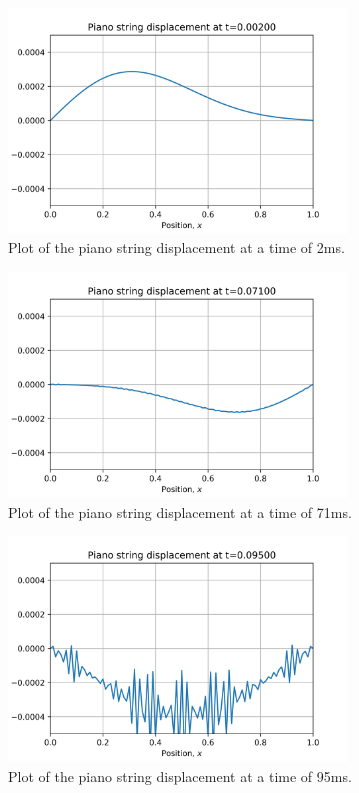 \documentclass{article}
\begin{document}
\begin{figure}[H]
	\centering
	\includegraphics[width=0.8\textwidth]{../images/q2_plot_2.png}
	\caption{Plot of the piano string displacement at a time of 2ms.}
	\label{fig:q2_2}
\end{figure}

\begin{figure}[H]
	\centering
	\includegraphics[width=0.8\textwidth]{../images/q2_plot_71.png}
	\caption{Plot of the piano string displacement at a time of 71ms.}
	\label{fig:q2_71}
\end{figure}

\begin{figure}[H]
	\centering
	\includegraphics[width=0.8\textwidth]{../images/q2_plot_95.png}
	\caption{Plot of the piano string displacement at a time of 95ms.}
	\label{fig:q2_95}
\end{figure}
\end{document}
